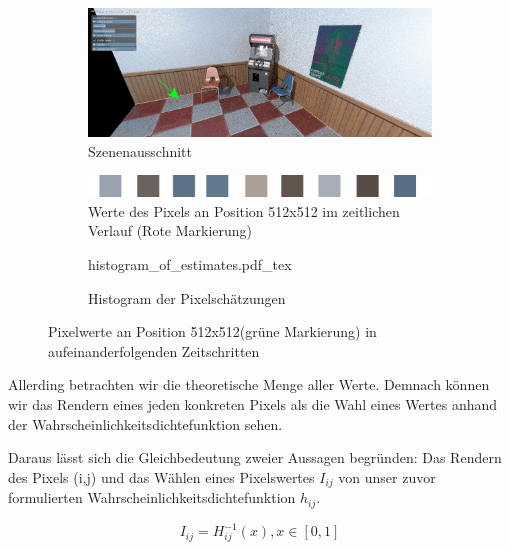 \begin{figure}[H]

    \begin{subfigure}{\textwidth}
        \centering \includegraphics[width=0.6\linewidth]{content/TemporalerAlg/Bilder/APosteriori/frame_t_whitenosie2.0.png} 
        \caption{Szenenausschnitt}
        \label{fig:szene_pixel_position_512x512}
    \end{subfigure}

    \begin{subfigure}{0.5\textwidth}
        \centering \includegraphics[width=0.6\linewidth]{content/TemporalerAlg/Bilder/APosteriori/pixel_512x512_strip.png} 
        \caption{Werte des Pixels an Position 512x512 im zeitlichen Verlauf (Rote Markierung)}
        \label{fig:ausschnitt_pixelstrip}
    \end{subfigure}
    \begin{subfigure}{0.5\textwidth}
            \centering
            \def\svgwidth{\columnwidth}
            {histogram_of_estimates.pdf_tex}
            \label{histogramOfEstimates}
            \caption{Histogram der Pixelschätzungen}
    \end{subfigure}
        \caption{Pixelwerte an Position 512x512(grüne Markierung) in aufeinanderfolgenden Zeitschritten}
        \label{fig:Pixelwerte}

\end{figure}

Allerding betrachten wir die theoretische Menge aller Werte. Demnach können wir das Rendern 
eines jeden konkreten Pixels als die Wahl eines Wertes anhand der Wahrscheinlichkeitsdichtefunktion
sehen.

Daraus lässt sich die Gleichbedeutung zweier Aussagen begründen:
Das Rendern des Pixels (i,j) und das Wählen eines Pixelswertes $I_{ij}$
von unser zuvor formulierten Wahrscheinlichkeitsdichtefunktion $h_{ij}$.

\begin{equation}\label{eq:inverse Funktion}
    I_{ij} = H_{ij}^{-1}(x), x \in [0,1]
\end{equation}


